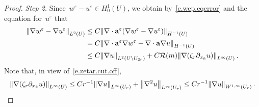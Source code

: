 \documentclass[11pt,twoside]{article} %
\numberwithin{equation}{section}
\theoremstyle{definition}
\let\originalleft\left
\let\originalright\right
\renewcommand{\left}{\mathopen{}\mathclose\bgroup\originalleft}
\renewcommand{\right}{\aftergroup\egroup\originalright}
\newcommand{\eps}{\varepsilon}
\newcommand{\ep}{\eps}
\renewcommand{\a}{\mathbf{a}}
\newcommand{\ahom}{\bar{\a}}
\begin{document}
\begin{proof}
\emph{Step 2.} 
Since~$w^\ep - u^\ep \in H_0^1(U)$, we obtain by~\eqref{e.wep.eqerror} and the equation for~$u^\ep$ that
\begin{align}
\label{e.wepuepest.a}
\left\| \nabla w^\ep - \nabla u^\ep  \right\|_{L^2 (U)} 
&
\leq
C \left\| \nabla \cdot \a^\ep (\nabla w^\ep - \nabla u^\ep ) \right\|_{H^{-1}(U)} 
\notag \\ & 
=
C \left\| \nabla \cdot \a^\ep \nabla w^\ep - \nabla \cdot \ahom \nabla u \right\|_{H^{-1}(U)} 
\notag \\ & 
\leq 
C \left\| \nabla u \right\|_{L^2(U \setminus U_{2r})}
+ 
C \mathcal{R}(m)
\left\| \nabla (\zeta_r \partial_{x_k} u) \right\|_{L^\infty(U)}  
\,.
\end{align}
Note that, in view of~\eqref{e.zetar.cut.off},  
\begin{equation}
\left\| \nabla (\zeta_r \partial_{x_k} u) \right\|_{L^\infty(U)}  
\leq
Cr^{-1} \left\| \nabla u \right\|_{L^\infty(U_r)}
+
\left\| \nabla^2 u \right\|_{L^\infty(U_r)} 
\leq 
C r^{-1} \left\| \nabla u \right\|_{W^{1,\infty}(U_r)}
\,.
\end{equation}


\smallskip


\end{proof}
\end{document}
